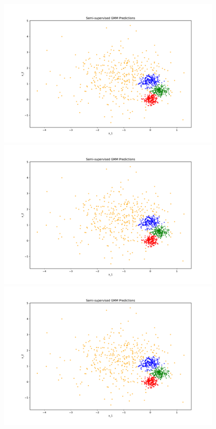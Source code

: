 \begin{answer}
\begin{figure}[!h]
  \includegraphics[width=\linewidth]{semi_supervised_em/pred_ss_0.pdf}
\endminipage\hfill
{}
  \includegraphics[width=\linewidth]{semi_supervised_em/pred_ss_1.pdf}
\endminipage\hfill
{}%
  \includegraphics[width=\linewidth]{semi_supervised_em/pred_ss_2.pdf}

\end{figure}
\end{answer}
